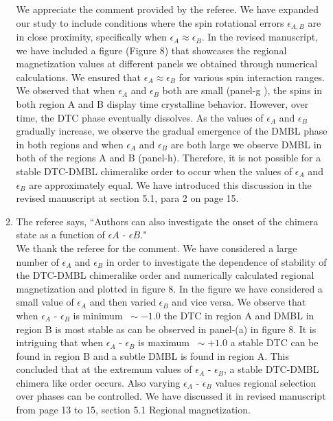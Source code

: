\documentclass[aps,prb,reprint,showpacs,floatfix,superscriptaddress, onecolumn, nofootinbib, 10pt]{revtex4-2}
\newcommand{\response}[1]{{\color{black}#1}} %
\newcommand{\comment}[1]{{\color{blue}#1}} %
\begin{document}
\begin{enumerate}
\begin{enumerate}
		\response{	
		We appreciate the comment provided by the referee. We have expanded our study to include conditions where the spin rotational errors $\epsilon_{A,B}$ are in close proximity, specifically when $\epsilon_A \approx \epsilon_B$. In the revised manuscript, we have included a figure (Figure 8) that showcases the regional magnetization values at different panels we obtained through numerical calculations. We ensured that $\epsilon_A \approx \epsilon_B$ for various spin interaction ranges. We observed that when $\epsilon_A$ and $\epsilon_B$ both are small (panel-g ), the spins in both region A and B display time crystalline behavior. However, over time, the DTC phase eventually dissolves. As the values of $\epsilon_A$ and $\epsilon_B$ gradually increase, we observe the gradual emergence of the DMBL phase in both regions and when $\epsilon_A$ and $\epsilon_B$ are both large we observe DMBL in both of the regions A and B (panel-h). Therefore, it is not possible for a stable DTC-DMBL chimeralike order to occur when the values of $\epsilon_A$ and $\epsilon_B$ are approximately equal. We have introduced this discussion in the revised manuscript at section 5.1, para 2 on page 15.
		}\\
	
		\item The referee says, \comment{``Authors can also investigate the onset of the chimera state as a function of $\epsilon A$ - $\epsilon B$."}\\
		
		\response{We thank the referee for the comment. We have considered a large number of $\epsilon_A$ and $\epsilon_B$ in order to investigate the dependence of stability of the DTC-DMBL chimeralike order and numerically calculated regional magnetization and plotted in figure 8. In the figure we have considered a small value of $\epsilon_A$ and then varied $\epsilon_B$ and vice versa. We observe that when $\epsilon_A$ - $\epsilon_B$ is minimum $~\sim -1.0$ the DTC in region A and DMBL in region B is most stable as can be observed in panel-(a) in figure 8. It is intriguing that when   $\epsilon_A$ - $\epsilon_B$ is maximum $~\sim +1.0$ a stable DTC can be found in region B and a subtle DMBL is found in region A. This concluded that at the extremum values of  $\epsilon_A$ - $\epsilon_B$, a stable DTC-DMBL chimera like order occurs. Also varying $\epsilon_A$ - $\epsilon_B$ values regional selection over phases can be controlled. We have discussed it in revised manuscript from page 13 to 15, section 5.1 Regional magnetization. }
		

\end{enumerate}
\end{enumerate}
\end{document}
